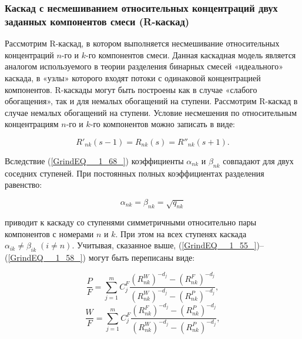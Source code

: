 \subsubsection{Каскад с несмешиванием относительных концентраций двух заданных компонентов смеси (R-каскад)}

Рассмотрим R-каскад, в котором выполняется несмешивание относительных концентраций $n$-го и $k$-го компонентов смеси. Данная каскадная модель является аналогом используемого в теории разделения бинарных смесей «идеального» каскада, в «узлы» которого входят потоки с одинаковой концентрацией компонентов. R-каскады могут быть построены как в случае «слабого обогащения», так и для немалых обогащений на ступени. Рассмотрим R-каскад в случае немалых обогащений на ступени. Условие несмешения по относительным концентрациям $n$-го и $k$-го компонентов можно записать в виде:

\begin{equation} \label{GrindEQ__1_68_} 
  R'_{nk} (s-1)=R_{nk} (s)=R''_{nk} (s+1).                                                 
\end{equation} 

Вследствие (\ref{GrindEQ__1_68_}) коэффициенты $\alpha _{nk} $ и $\beta _{nk} $ совпадают для двух соседних ступеней. При постоянных полных коэффициентах разделения равенство:

\begin{equation} \label{GrindEQ__1_69_} 
  \alpha _{nk} =\beta _{nk} =\sqrt{q_{nk} }  
\end{equation} 

приводит к каскаду со ступенями симметричными относительно пары компонентов с номерами $n$ и $k$. При этом на всех ступенях каскада $\alpha _{ik} \ne \beta _{ik} \; (i\ne n)$. Учитывая, сказанное выше, (\ref{GrindEQ__1_55_})--(\ref{GrindEQ__1_58_}) могут быть переписаны виде:
  

\begin{equation} \label{GrindEQ__1_70_} 
  \frac{P}{F} =\sum _{j=1}^{m}C_{j}^{F} \frac{(R_{nk}^{W} )^{-d_{j} } -(R_{nk}^{F} )^{-d_{j} } }{(R_{nk}^{W} )^{-d_{j} } -(R_{nk}^{P} )^{-d_{j} } }  ,                                            
  \end{equation} 
  \begin{equation} \label{GrindEQ__1_71_} 
  \frac{W}{F} =\sum _{j=1}^{m}C_{j}^{F} \frac{(R_{nk}^{F} )^{-d_{j} } -(R_{nk}^{P} )^{-d_{j} } }{(R_{nk}^{W} )^{-d_{j} } -(R_{nk}^{P} )^{-d_{j} } }  ,                                        
\end{equation} 

